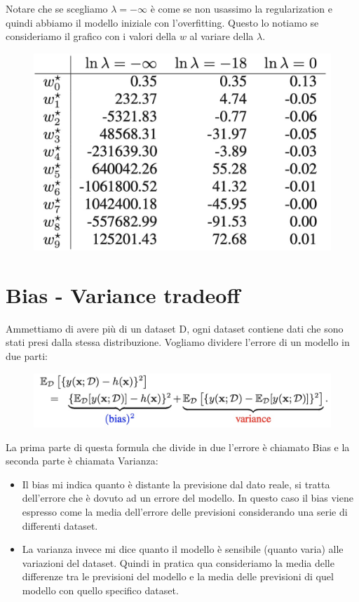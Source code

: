 \documentclass[14pt]{extreport}
\begin{document}
Notare che se scegliamo $\lambda = - \infty$ è come se non usassimo la regularization e quindi abbiamo il modello iniziale con l'overfitting. Questo
lo notiamo se consideriamo il grafico con i valori della $w$ al variare della $\lambda$.

\begin{figure}[H]
	\centering
	\includegraphics[width=0.4\linewidth]{91.jpeg}
\end{figure}


\section{Bias - Variance tradeoff}

Ammettiamo di avere più di un dataset D, ogni dataset contiene dati che sono stati presi dalla stessa distribuzione. Vogliamo dividere l'errore di un
modello in due parti:

\begin{figure}[H]
	\centering
	\includegraphics[width=0.7\linewidth]{92.jpeg}
\end{figure}

La prima parte di questa formula che divide in due l'errore è chiamato Bias e la seconda parte è chiamata Varianza:
\begin{itemize}
	\item Il bias mi indica quanto è distante la previsione dal dato reale, si tratta dell'errore che è dovuto ad un errore del modello. In questo
	      caso il bias viene espresso come la media dell'errore delle previsioni considerando una serie di differenti dataset.
	\item La varianza invece mi dice quanto il modello è sensibile (quanto varia) alle variazioni del dataset. Quindi in pratica qua consideriamo la
	      media delle differenze tra le previsioni del modello e la media delle previsioni di quel modello con quello specifico dataset.
\end{itemize}
\end{document}
